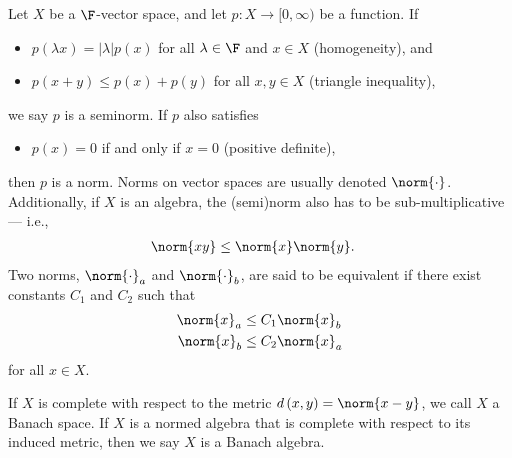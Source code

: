 \begin{definition}\label{def:norms}
  Let $X$ be a $\F$-vector space, and let $p\colon X\rightarrow [0,\infty)$ be a function. If
  \begin{itemize}
    \item $p\left(\lambda x\right) = \left\vert \lambda \right\vert p(x)$ for all $\lambda\in \F$ and $x\in X$ (homogeneity), and
    \item $p\left(x + y\right)\leq p\left(x\right) + p\left(y\right)$ for all $x,y\in X$ (triangle inequality),
  \end{itemize}
  we say $p$ is a seminorm. If $p$ also satisfies
  \begin{itemize}
    \item $p\left(x\right) = 0 $ if and only if $x = 0$ (positive definite),
  \end{itemize}
  then $p$ is a norm. Norms on vector spaces are usually denoted $\norm{\cdot}$. Additionally, if $X$ is an algebra, the (semi)norm also has to be sub-multiplicative --- i.e.,
  \begin{align*}
    \norm{xy} &\leq \norm{x}\norm{y}.
  \end{align*}
  Two norms, $\norm{\cdot}_a$ and $\norm{\cdot}_b$, are said to be equivalent if there exist constants $C_1$ and $C_2$ such that
  \begin{align*}
    \norm{x}_a &\leq C_1\norm{x}_b\\
    \norm{x}_b &\leq C_2 \norm{x}_a
  \end{align*}
  for all $x\in X$.\newline

  If $X$ is complete with respect to the metric $d\left(x,y\right) = \norm{x-y}$, we call $X$ a Banach space. If $X$ is a normed algebra that is complete with respect to its induced metric, then we say $X$ is a Banach algebra.
\end{definition}
